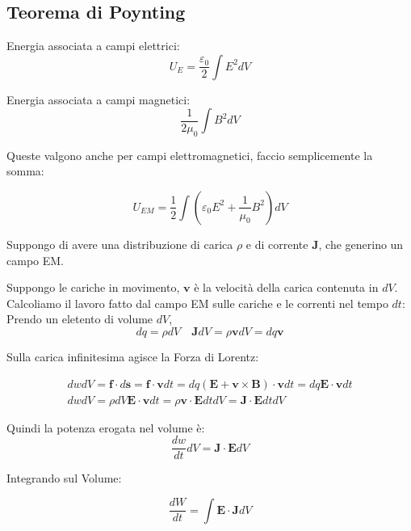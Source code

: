 \documentclass[a4paper]{scrarticle}
\begin{document}
\subsection{Teorema di Poynting}

Energia associata a campi elettrici:
\begin{equation*}
    U_E = \frac{\varepsilon_0}{2} \int E^2 dV 
\end{equation*}

Energia associata a campi magnetici:
\begin{equation*}
    \frac{1}{2 \mu_0} \int B^2 dV
\end{equation*}

Queste valgono anche per campi elettromagnetici, faccio semplicemente la somma:

\begin{equation}
    U_{EM} = \frac{1}{2} \int (\varepsilon_0 E^2 + \frac{1}{\mu_0} B^2)dV
\end{equation}

Suppongo di avere una distribuzione di carica $\rho$ e di corrente $\bm J$, che generino un campo EM.

Suppongo le cariche in movimento, $\bm v$ è la velocità della carica contenuta in $dV$.
Calcoliamo il lavoro fatto dal campo EM sulle cariche e le correnti nel tempo $dt$:
Prendo un eletento di volume $dV$,
\begin{equation*}
    dq = \rho dV \quad \bm J dV = \rho \bm v dV = dq \bm v
\end{equation*}

Sulla carica infinitesima agisce la Forza di Lorentz:

\begin{gather*}
    dw dV = \bm f \cdot d\bm s = \bm f \cdot \bm v dt = dq (\bm E + \bm v\times \bm B )\cdot \bm v dt = dq \bm E \cdot \bm v dt\\
    dw dV = \rho dV \bm E \cdot \bm v dt = \rho \bm v \cdot \bm E dtdV = \bm J \cdot \bm E dtdV
\end{gather*}

Quindi la potenza erogata nel volume è:
\begin{equation}
    \frac{dw}{dt}dV = \bm J \cdot \bm E dV
\end{equation}

Integrando sul Volume:

\begin{equation*}
    \frac{dW}{dt}= \int \bm E \cdot \bm J dV
\end{equation*}
\end{document}
